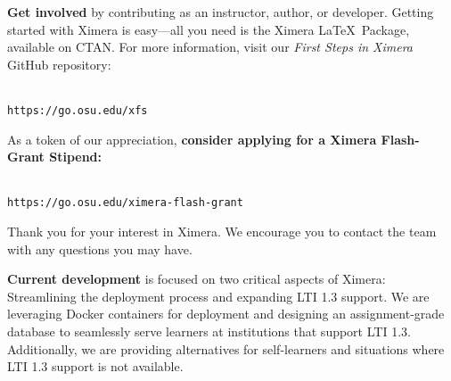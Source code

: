 \documentclass[twocolumn]{article}
\begin{document}
\begin{xframe}
    {\sffamily\bfseries Get involved} by contributing as an instructor, author,
    or developer. Getting started with Ximera is easy---all you need is the
    Ximera \LaTeX\ Package, available on CTAN. For more information, visit our
    \textit{First Steps in Ximera} GitHub repository:
    \begin{center}
        \\
        \small\tt https://go.osu.edu/xfs
    \end{center}
    As a token of our appreciation, \textbf{consider applying for a Ximera
        Flash-Grant Stipend:}
    \begin{center}
        \\
        \small\tt https://go.osu.edu/ximera-flash-grant
    \end{center}
    Thank you for your interest in Ximera. We encourage you to contact the
    team with any questions you may have.
\end{xframe}


\vspace{-.2cm}  


\begin{xframe}
    {\sffamily\bfseries Current development} is focused on two critical aspects
    of Ximera: Streamlining the deployment process and expanding LTI 1.3
    support.
    We are leveraging Docker containers for deployment and designing an
    assignment-grade database to seamlessly serve learners at institutions that
    support LTI 1.3. Additionally, we are providing alternatives for
    self-learners
    and situations where LTI 1.3 support is not available.
    \begin{center}
    \end{center}
\end{xframe}
\end{document}
